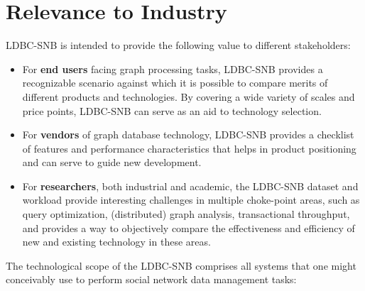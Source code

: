 
\section{Relevance to Industry}

LDBC-SNB is intended to provide the following value to different stakeholders:

\begin{itemize}
 \item For \textbf{end users} facing graph processing tasks, LDBC-SNB provides
     a recognizable scenario against which it is possible to compare merits of
     different products and technologies.  By covering a wide variety of scales
     and price points, LDBC-SNB can serve as an aid to technology selection.
 \item For \textbf{vendors} of graph database technology, LDBC-SNB provides a
     checklist of features and performance characteristics that helps in
     product positioning and can serve to guide new development.
 \item For \textbf{researchers}, both industrial and academic, the LDBC-SNB
     dataset and workload provide interesting challenges in multiple
     choke-point areas, such as query optimization, (distributed) graph
     analysis, transactional throughput, and provides a way to objectively
     compare the effectiveness and efficiency of new and existing technology in
     these areas.
\end{itemize}

The technological scope of the LDBC-SNB comprises all systems that one might
conceivably use to perform social network data management tasks:

